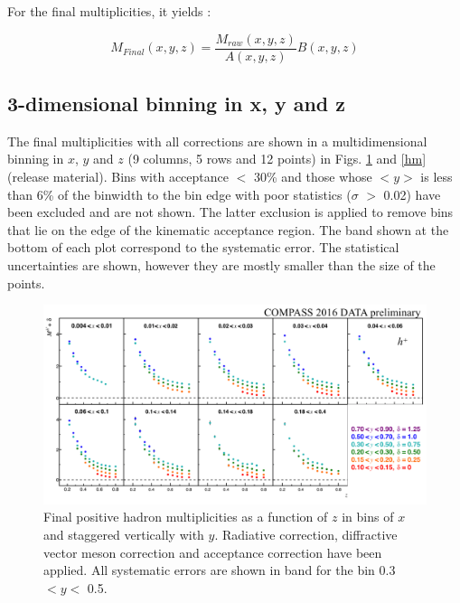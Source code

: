 \documentclass[letterpaper,12pt]{article}
\begin{document}
For the final multiplicities, it yields :

\begin{equation}
	M_{Final}(x,y,z) = \frac{M_{raw}(x,y,z)}{A(x,y,z)}B(x,y,z)
\end{equation}

\subsection{3-dimensional binning in x, y and z}

The final multiplicities with all corrections are shown in a multidimensional binning in $x$, $y$ and $z$ (9 columns, 5 rows and 12 points) in Figs. \ref{hp} and \ref{hm} (release material). Bins with acceptance $<$ 30\% and those whose $<y>$ is less than 6\% of the binwidth to the bin edge with poor statistics ($\sigma$ $>$ 0.02) have been excluded and are not shown. The latter exclusion is applied to remove bins that lie on the edge of the kinematic acceptance region. The band shown at the bottom of each plot correspond to the systematic error. The statistical uncertainties are shown, however they are mostly smaller than the size of the points.

\begin{figure}
	\includegraphics[scale=0.5]{./gfx/hp.png}
	\caption{Final positive hadron multiplicities as a function of $z$ in bins of $x$ and staggered vertically with $y$. Radiative correction, diffractive vector meson correction and acceptance correction have been applied. All systematic errors are shown in band for the bin 0.3 $< y <$ 0.5.}
	\label{hp}
\end{figure}
\end{document}
